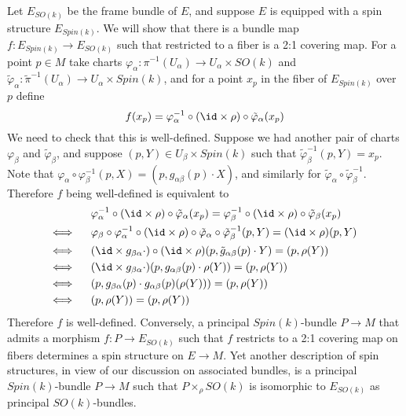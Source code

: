 Let $E_{SO(k)}$ be the frame bundle of $E$, and suppose $E$ is equipped with a spin structure $E_{Spin(k)}$. We will show that there is a bundle map $f : E_{Spin(k)} \rightarrow E_{SO(k)}$ such that restricted to a fiber is a 2:1 covering map. For a point $p \in M$ take charts $\varphi_\alpha : \pi^{-1}(U_\alpha) \rightarrow U_\alpha \times SO(k)$ and $\tilde{\varphi}_\alpha : \tilde{\pi}^{-1}(U_\alpha) \rightarrow U_\alpha \times Spin(k)$, and for a point $x_p$ in the fiber of $E_{Spin(k)}$ over $p$ define
\[ f(x_p) = \varphi_{\alpha}^{-1} \circ (\id \times \rho) \circ \tilde{\varphi}_{\alpha}(x_p) \]
We need to check that this is well-defined. Suppose we had another pair of charts $\varphi_\beta$ and $\tilde{\varphi}_\beta$, and suppose $(p,Y) \in U_\beta \times Spin(k)$ such that $\tilde{\varphi}_\beta^{-1}(p,Y) = x_p$. Note that $\varphi_\alpha \circ \varphi_\beta^{-1}(p,X) = (p,g_{\alpha\beta}(p) \cdot X)$, and similarly for $\tilde{\varphi}_\alpha \circ \tilde{\varphi}_\beta^{-1}$. Therefore $f$ being well-defined is equivalent to
\begin{align*}
	 & \varphi_\alpha^{-1} \circ (\id \times \rho) \circ \tilde{\varphi}_\alpha(x_p) = \varphi_\beta^{-1} \circ (\id \times \rho) \circ \tilde{\varphi}_\beta(x_p) \\
	\Longleftrightarrow \ \ \ \ \ & \varphi_\beta \circ \varphi_\alpha^{-1} \circ (\id \times \rho) \circ \tilde{\varphi}_\alpha \circ \tilde{\varphi}_\beta^{-1}(p,Y) = (\id \times \rho)(p,Y) \\
	\Longleftrightarrow \ \ \ \ \ & (\id \times g_{\beta\alpha} \cdot) \circ (\id \times \rho) (p, \tilde{g}_{\alpha\beta}(p) \cdot Y) = (p,\rho(Y)) \\
	\Longleftrightarrow \ \ \ \ \ & (\id \times g_{\beta\alpha} \cdot) (p, g_{\alpha\beta}(p) \cdot \rho(Y)) = (p,\rho(Y)) \\
	\Longleftrightarrow \ \ \ \ \ & (p, g_{\beta\alpha}(p) \cdot g_{\alpha\beta}(p)(\rho(Y))) = (p,\rho(Y)) \\
	\Longleftrightarrow \ \ \ \ \ & (p,\rho(Y)) = (p,\rho(Y))
\end{align*}
Therefore $f$ is well-defined. Conversely, a principal $Spin(k)$-bundle $P \rightarrow M$ that admits a morphism $f : P \rightarrow E_{SO(k)}$ such that $f$ restricts to a 2:1 covering map on fibers determines a spin structure on $E \rightarrow M$. Yet another description of spin structures, in view of our discussion on associated bundles, is a principal $Spin(k)$-bundle $P \rightarrow M$ such that $P \times_\rho SO(k)$ is isomorphic to $E_{SO(k)}$ as principal $SO(k)$-bundles.

